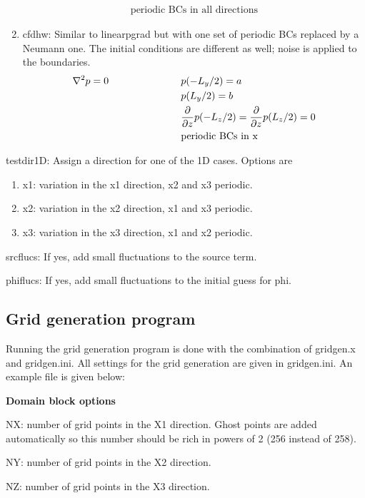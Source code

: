 \begin{description}
\begin{enumerate}
\begin{align*}
        \text{periodic BCs in all directions}
      \end{align*}
    \item cfdhw: Similar to linearpgrad but with one set of periodic BCs
                 replaced by a Neumann one. The initial conditions are 
                 different as well; noise is applied to the boundaries.
      \begin{align*}
        \nabla^2 p = 0 \hspace{1.0in}
         & p(-L_y/2) = a \\
         & p(L_y/2) = b \\
         & \frac{\partial }{\partial z} p(-L_z/2)= \frac{\partial }{\partial z} p(L_z/2) = 0 \\
         & \text{periodic BCs in x}
      \end{align*}
  \end{enumerate}
  \item testdir1D: Assign a direction for one of the 1D cases. Options are
  \begin{enumerate}
    \item x1: variation in the x1 direction, x2 and x3 periodic.
    \item x2: variation in the x2 direction, x1 and x3 periodic.
    \item x3: variation in the x3 direction, x1 and x2 periodic.
  \end{enumerate}
  \item srcflucs: If yes, add small fluctuations to the source term.
  \item phiflucs: If yes, add small fluctuations to the initial guess for phi.
\end{description}

\subsection{Grid generation program}
Running the grid generation program is done with the combination of gridgen.x
and gridgen.ini. All settings for the grid generation are given in gridgen.ini.
An example file is given below:


\textbf{Domain block options}
\begin{description}
  \item NX: number of grid points in the X1 direction. Ghost points are added
            automatically so this number should be rich in powers of 2
            (256 instead of 258). 
  \item NY: number of grid points in the X2 direction.
  \item NZ: number of grid points in the X3 direction.
\end{description}

